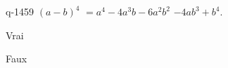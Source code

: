 \begin{truefalse}{q-1459}
$(a-b)^4$ $=a^4-4a^3b-6a^2b^2$ $-4ab^3+b^4$.
\item Vrai
\item* Faux
\end{truefalse}

